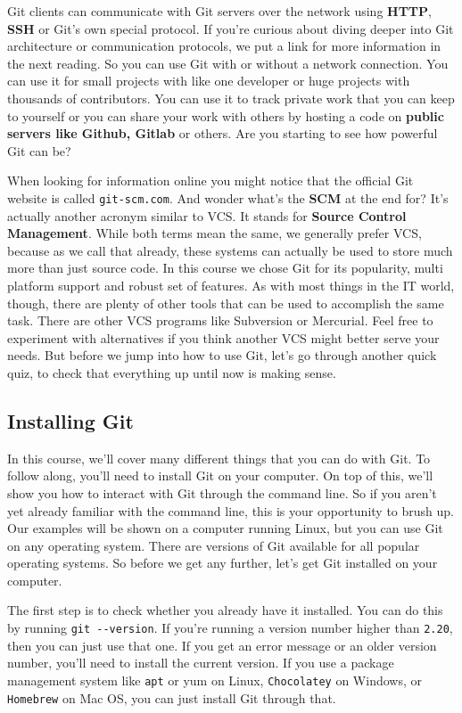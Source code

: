 	Git clients can communicate with Git servers over the network using \textbf{HTTP}, \textbf{SSH} or Git's own special protocol. If you're curious about diving deeper into Git architecture or communication protocols, we put a link for more information in the next reading. So you can use Git with or without a network connection. You can use it for small projects with like one developer or huge projects with thousands of contributors. You can use it to track private work that you can keep to yourself or you can share your work with others by hosting a code on \textbf{public servers like Github, Gitlab} or others. Are you starting to see how powerful Git can be?
	
	When looking for information online you might notice that the official Git website is called \verb|git-scm.com|. And wonder what's the \textbf{SCM} at the end for? It's actually another acronym similar to VCS. It stands for \textbf{Source Control Management}. 
	While both terms mean the same, we generally prefer VCS, because as we call that already, these systems can actually be used to store much more than just source code. In this course we chose Git for its popularity, multi platform support and robust set of features. 
	As with most things in the IT world, though, there are plenty of other tools that can be used to accomplish the same task. There are other VCS programs like Subversion or Mercurial. Feel free to experiment with alternatives if you think another VCS might better serve your needs. But before we jump into how to use Git, let's go through another quick quiz, to check that everything up until now is making sense.
	
	\subsection{Installing Git}
	
	
	In this course, we'll cover many different things that you can do with Git. To follow along, you'll need to install Git on your computer. On top of this, we'll show you how to interact with Git through the command line. 
	So if you aren't yet already familiar with the command line, this is your opportunity to brush up. Our examples will be shown on a computer running Linux, but you can use Git on any operating system. There are versions of Git available for all popular operating systems. So before we get any further, let's get Git installed on your computer. 
	
	The first step is to check whether you already have it installed. You can do this by running \verb|git --version|. If you're running a version number higher than \verb|2.20|, then you can just use that one. If you get an error message or an older version number, you'll need to install the current version. If you use a package management system like \texttt{apt} or yum on Linux, \texttt{Chocolatey} on Windows, or \texttt{Homebrew} on Mac OS, you can just install Git through that. 
	
